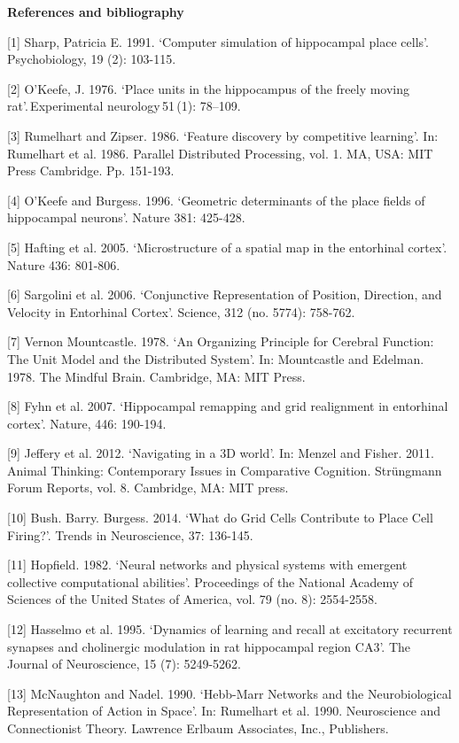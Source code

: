 \noindent
\textbf{References and bibliography}

[1] Sharp, Patricia E. 1991. ‘Computer simulation of hippocampal place cells’. Psychobiology, 19 (2): 103-115.

[2] O'Keefe, J. 1976. ‘Place units in the hippocampus of the freely moving rat’. Experimental neurology 51 (1): 78–109. 

[3] Rumelhart and Zipser. 1986. ‘Feature discovery by competitive learning’. In: Rumelhart et al. 1986. Parallel Distributed Processing, vol. 1. MA, USA: MIT Press Cambridge. Pp. 151-193. 

[4] O’Keefe and Burgess. 1996. ‘Geometric determinants of the place fields of hippocampal neurons’. Nature 381: 425-428. 

[5] Hafting et al. 2005. ‘Microstructure of a spatial map in the entorhinal cortex’. Nature 436: 801-806. 

[6] Sargolini et al. 2006. ‘Conjunctive Representation of Position, Direction, and Velocity in Entorhinal Cortex’. Science, 312 (no. 5774): 758-762. 

[7] Vernon Mountcastle. 1978. ‘An Organizing Principle for Cerebral Function: The Unit Model and the Distributed System’. In: Mountcastle and Edelman. 1978. The Mindful Brain. Cambridge, MA: MIT Press. 

[8] Fyhn et al. 2007. ‘Hippocampal remapping and grid realignment in entorhinal cortex’. Nature, 446: 190-194.  

[9] Jeffery et al. 2012. ‘Navigating in a 3D world’. In: Menzel and Fisher. 2011. Animal Thinking: Contemporary Issues in Comparative Cognition. Strüngmann Forum Reports, vol. 8. Cambridge, MA: MIT press. 

[10] Bush. Barry. Burgess. 2014. ‘What do Grid Cells Contribute to Place Cell Firing?’. Trends in Neuroscience, 37: 136-145. 

[11] Hopfield. 1982. ‘Neural networks and physical systems with emergent collective computational abilities’. Proceedings of the National Academy of Sciences of the United States of America, vol. 79 (no. 8): 2554-2558. 

[12] Hasselmo et al. 1995. ‘Dynamics of learning and recall at excitatory recurrent synapses and cholinergic modulation in rat hippocampal region CA3’. The Journal of Neuroscience, 15 (7): 5249-5262. 

[13] McNaughton and Nadel. 1990. ‘Hebb-Marr Networks and the Neurobiological Representation of Action in Space’. In: Rumelhart et al. 1990. Neuroscience and Connectionist Theory. Lawrence Erlbaum Associates, Inc., Publishers. 

